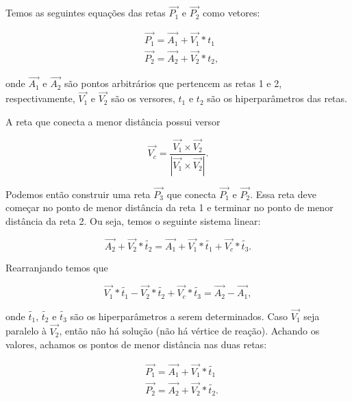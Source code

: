 \documentclass[a4paper,12pt,oneside]{book}
\begin{document}
\par Temos as seguintes equações das retas $\vec{P_1}$ e $\vec{P_2}$ como vetores:

\begin{equation}
\begin{split}
        &\vec{P_1} = \vec{A_1} + \vec{V_1} * t_1 \\
        &\vec{P_2} = \vec{A_2} + \vec{V_2} * t_2,
\end{split}
\end{equation}

onde $\vec{A_1}$ e $\vec{A_2}$ são pontos arbitrários que pertencem as retas 1 e 2, respectivamente, $\vec{V_1}$ e $\vec{V_2}$ são os versores, $t_1$ e  $t_2$ são os hiperparâmetros das retas.

\par A reta que conecta a menor distância possui versor

\begin{equation}\label{eq:versor_menor_dist}
    \vec{V_c} = \frac{\vec{V_1} \times \vec{V_2}}{\left | \vec{V_1} \times \vec{V_2} \right |}.
\end{equation}

Podemos então construir uma reta $\vec{P_3}$ que conecta $\vec{P_1}$ e $\vec{P_2}$. Essa reta deve começar no ponto de menor distância da reta 1 e terminar no ponto de menor distância da reta 2. Ou seja, temos o seguinte sistema linear:

\begin{equation*}
    \vec{A_2} + \vec{V_2} * \tilde{t_2} = \vec{A_1} + \vec{V_1} * \tilde{t_1} + \vec{V_c} * \tilde{t_3}.
\end{equation*}

Rearranjando temos que

\begin{equation}\label{eq:sistema_vertice}
    \vec{V_1} * \tilde{t_1} - \vec{V_2} * \tilde{t_2} + \vec{V_c} * \tilde{t_3} = \vec{A_2} - \vec{A_1},
\end{equation}

onde $\tilde{t_1}$, $\tilde{t_2}$ e $\tilde{t_3}$ são os hiperparâmetros a serem determinados. Caso $\vec{V_1}$ seja paralelo à $\vec{V_2}$, então não há solução (não há vértice de reação). Achando os valores, achamos os pontos de menor distância nas duas retas:

\begin{equation}
\begin{split}
        &\vec{P_1} = \vec{A_1} + \vec{V_1} * \tilde{t_1} \\
        &\vec{P_2} = \vec{A_2} + \vec{V_2} * \tilde{t_2}.
\end{split}
\end{equation}
\end{document}
